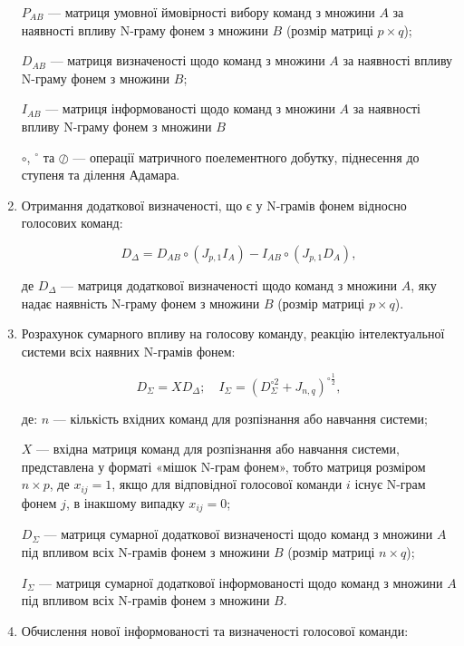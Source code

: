 \begin{enumerate}
{		$P_{AB}$ --- матриця умовної ймовірності вибору команд з множини $A$ за наявності впливу N-граму фонем з множини $B$ (розмір матриці $p\times q$);
		
		$D_{AB}$ --- матриця визначеності щодо команд з множини $A$ за наявності впливу N-граму фонем з множини $B$;
		
		$I_{AB}$ --- матриця інформованості щодо команд з множини $A$ за наявності впливу N-граму фонем з множини $B$
		
		$\circ$, ${}^{\circ}$ та $\oslash$ --- операції матричного поелементного добутку, піднесення до ступеня та ділення Адамара.
		
	}
	
	\item Отримання додаткової визначеності, що є у N-грамів фонем відносно голосових команд:
	
	\[
	D_\Delta=D_{AB} \circ (J_{p,1}I_A)-I_{AB} \circ (J_{p,1}D_A),
	\]
	
	де $D_\Delta$ --- матриця додаткової визначеності щодо команд з множини $A$, яку надає наявність N-граму фонем з множини $B$ (розмір матриці $p\times q$).
	
	\item Розрахунок сумарного впливу на голосову команду, реакцію інтелектуальної системи всіх наявних N-грамів фонем:
	
	\[
	D_\Sigma = XD_\Delta;\quad I_\Sigma=(D_\Sigma^{\circ 2}+J_{n,q})^{\circ \frac{1}{2}},
	\]
	
	де: $n$ --- кількість вхідних команд для розпізнання або навчання системи; 
	
	{\settowidth{\leftskip}{де:\ }
		
		$X$ --- вхідна матриця команд для розпізнання або навчання системи, представлена у форматі «мішок N-грам фонем», тобто матриця розміром $n \times p$, де $x_{ij}=1$, якщо для відповідної голосової команди $i$ існує N-грам фонем $j$, в інакшому випадку $x_{ij}=0$;
		
		$D_\Sigma$ --- матриця сумарної додаткової визначеності щодо команд  з множини $A$ під впливом всіх N-грамів фонем з множини $B$ (розмір матриці $n\times q$);
		
		$I_\Sigma$ --- матриця сумарної додаткової інформованості щодо команд  з множини $A$ під впливом всіх N-грамів фонем з множини $B$.
		
	}
	
	\item Обчислення нової інформованості та визначеності голосової команди:
	

\end{enumerate}
